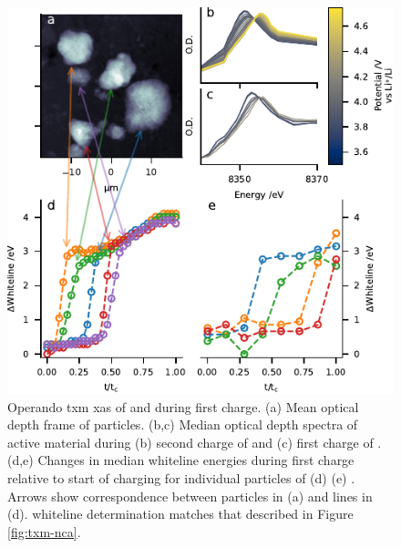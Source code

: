\documentclass{article}
\begin{document}
\begin{figure}[!h]
  \includegraphics{figures/nmc_txm.pdf}
  \caption{Operando \gls{txm} \gls{xas} of \nmc[333]{} and \nmc[532]{}
    during first charge. (a) Mean optical depth frame of \nmc[333]{}
    particles. (b,c) Median optical depth spectra of active material
    during (b) second charge of \nmc[333]{} and (c) first charge of
    \nmc[532]{}. (d,e) Changes in median whiteline energies during
    first charge relative to start of charging for individual
    particles of (d) \nmc[333]{} (e) \nmc[532]{}. Arrows show
    correspondence between particles in (a) and lines in
    (d). \textDelta{}whiteline determination matches that described in
    Figure \ref{fig:txm-nca}.}
  \label{fig:txm-nmc}
\end{figure}
\end{document}
